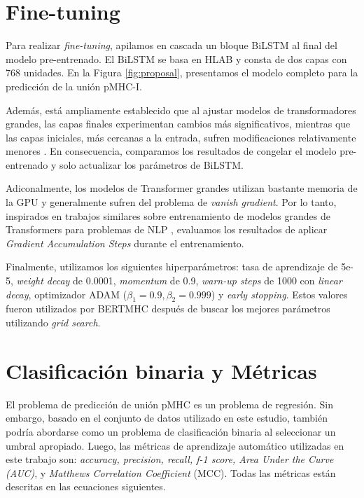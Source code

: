 \section{Fine-tuning}

Para realizar \textit{fine-tuning}, apilamos en cascada un bloque BiLSTM al final del modelo pre-entrenado. El BiLSTM se basa en HLAB \citep{zhang2022hlab} y consta de dos capas con 768 unidades. En la Figura \ref{fig:proposal}, presentamos el modelo completo para la predicción de la unión pMHC-I.

Además, está ampliamente establecido que al ajustar modelos de transformadores grandes, las capas finales experimentan cambios más significativos, mientras que las capas iniciales, más cercanas a la entrada, sufren modificaciones relativamente menores \citep{merchant2020happens,lee2019would,kovaleva2019revealing}. En consecuencia, comparamos los resultados de congelar el modelo pre-entrenado y solo actualizar los parámetros de BiLSTM.

Adiconalmente, los modelos de Transformer grandes utilizan bastante memoria de la GPU y generalmente sufren del problema de \textit{vanish gradient}. Por lo tanto, inspirados en trabajos similares sobre entrenamiento de modelos grandes de Transformers para problemas de NLP \citep{anil2021large,zhang2023adam,huang2023measuring}, evaluamos los resultados de aplicar \textit{Gradient Accumulation Steps} durante el entrenamiento.

Finalmente, utilizamos los siguientes hiperparámetros: tasa de aprendizaje de 5e-5, \textit{weight decay} de 0.0001, \textit{momentum} de 0.9, \textit{warn-up steps} de 1000 con \textit{linear decay}, optimizador ADAM ($\beta_1 = 0.9, \beta_2=0.999$) y \textit{early stopping}. Estos valores fueron utilizados por BERTMHC \citep{cheng2021bertmhc} después de buscar los mejores parámetros utilizando \textit{grid search}.

\section{Clasificación binaria y Métricas}

El problema de predicción de unión pMHC es un problema de regresión. Sin embargo, basado en el conjunto de datos utilizado en este estudio, también podría abordarse como un problema de clasificación binaria al seleccionar un umbral apropiado. Luego, las métricas de aprendizaje automático utilizadas en este trabajo son: \textit{accuracy, precision, recall, f-1 score, Area Under the Curve (AUC)}, y \textit{Matthews Correlation Coefficient} (MCC). Todas las métricas están descritas en las ecuaciones siguientes.

